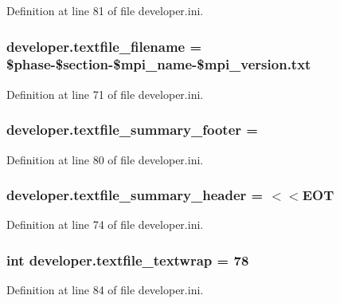 Definition at line 81 of file developer.\-ini.

\hypertarget{namespacedeveloper_a62386bf6ee2885e1743404547371cb44}{
\subsubsection[{textfile\-\_\-filename}]{\setlength{\rightskip}{0pt plus 5cm}developer.\-textfile\-\_\-filename = \$phase-\/\$section-\/\$mpi\-\_\-name-\/\$mpi\-\_\-version.\-txt}}\label{namespacedeveloper_a62386bf6ee2885e1743404547371cb44}


Definition at line 71 of file developer.\-ini.

\hypertarget{namespacedeveloper_a26c0369c438cb986cdf6a00bec4d4240}{
\subsubsection[{textfile\-\_\-summary\-\_\-footer}]{\setlength{\rightskip}{0pt plus 5cm}developer.\-textfile\-\_\-summary\-\_\-footer =}}\label{namespacedeveloper_a26c0369c438cb986cdf6a00bec4d4240}


Definition at line 80 of file developer.\-ini.

\hypertarget{namespacedeveloper_ac74e1296a1651a7640f6d7148c4e8181}{
\subsubsection[{textfile\-\_\-summary\-\_\-header}]{\setlength{\rightskip}{0pt plus 5cm}developer.\-textfile\-\_\-summary\-\_\-header = $<$$<$E\-O\-T}}\label{namespacedeveloper_ac74e1296a1651a7640f6d7148c4e8181}


Definition at line 74 of file developer.\-ini.

\hypertarget{namespacedeveloper_ae83d713d6405a20cfa321847993e98bc}{
\subsubsection[{textfile\-\_\-textwrap}]{\setlength{\rightskip}{0pt plus 5cm}int developer.\-textfile\-\_\-textwrap = 78}}\label{namespacedeveloper_ae83d713d6405a20cfa321847993e98bc}


Definition at line 84 of file developer.\-ini.

